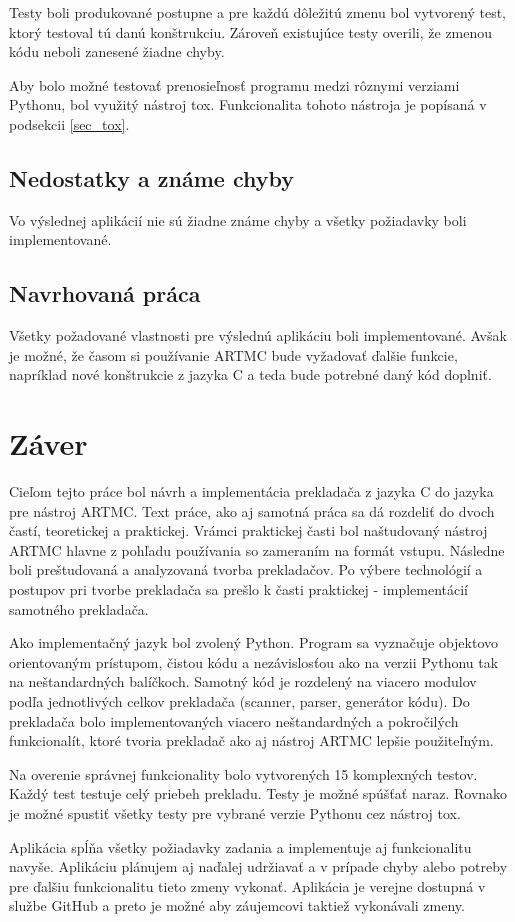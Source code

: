 Testy boli produkované postupne a pre každú dôležitú zmenu bol vytvorený test, ktorý testoval tú danú konštrukciu. Zároveň existujúce testy overili, že zmenou kódu neboli zanesené žiadne chyby.

Aby bolo možné testovať prenosieľnosť programu medzi rôznymi verziami Pythonu, bol využitý nástroj tox. Funkcionalita tohoto nástroja je popísaná v podsekcii \ref{sec_tox}.

\section{Nedostatky a známe chyby}
Vo výslednej aplikácií nie sú žiadne známe chyby a všetky požiadavky boli implementované.

\section{Navrhovaná práca}
Všetky požadované vlastnosti pre výslednú aplikáciu boli implementované. Avšak je možné, že časom si používanie ARTMC bude vyžadovať ďalšie funkcie, napríklad nové konštrukcie z jazyka C a teda bude potrebné daný kód doplniť. 

\chapter{Záver}
Cieľom tejto práce bol návrh a implementácia prekladača z jazyka C do jazyka pre nástroj ARTMC. Text práce, ako aj samotná práca sa dá rozdeliť do dvoch častí, teoretickej a praktickej. Vrámci praktickej časti bol naštudovaný nástroj ARTMC hlavne  z pohľadu používania so zameraním na formát vstupu. Následne boli preštudovaná a analyzovaná tvorba prekladačov. Po výbere technológií a postupov pri tvorbe prekladača sa prešlo k časti praktickej - implementácií samotného prekladača.

Ako implementačný jazyk bol zvolený Python. Program sa vyznačuje objektovo orientovaným prístupom, čistou kódu a nezávislosťou ako na verzii Pythonu tak na neštandardných balíčkoch. Samotný kód je rozdelený na viacero modulov podľa jednotlivých celkov prekladača (scanner, parser, generátor kódu). Do prekladača bolo implementovaných viacero neštandardných a pokročilých funkcionalít, ktoré tvoria prekladač ako aj nástroj ARTMC lepšie použiteľným.

Na overenie správnej funkcionality bolo vytvorených 15 komplexných testov. Každý test testuje celý priebeh prekladu. Testy je možné spúšťať naraz. Rovnako je možné spustiť všetky testy pre vybrané verzie Pythonu cez nástroj tox.

Aplikácia spĺňa všetky požiadavky zadania a implementuje aj funkcionalitu navyše. Aplikáciu plánujem aj naďalej udržiavať a v prípade chyby alebo potreby pre ďalšiu funkcionalitu tieto zmeny vykonať. Aplikácia je verejne dostupná v službe GitHub a preto je možné aby záujemcovi taktiež vykonávali zmeny.


